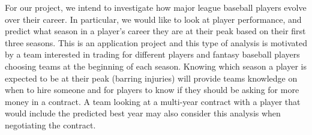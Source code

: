 \documentclass{article}
\begin{document}





For our project, we intend to investigate how major league baseball players evolve over their career. In particular, we would like to look at player performance, and predict what season in a player's career they are at their peak based on their first three seasons. This is an application project and this type of analysis is motivated by a team interested in trading for different players and fantasy baseball players choosing teams at the beginning of each season. Knowing which season a player is expected to be at their peak (barring injuries) will provide teams knowledge on when to hire someone and for players to know if they should be asking for more money in a contract. A team looking at a multi-year contract with a player that would include the predicted best year may also consider this analysis when negotiating the contract.
\end{document}
